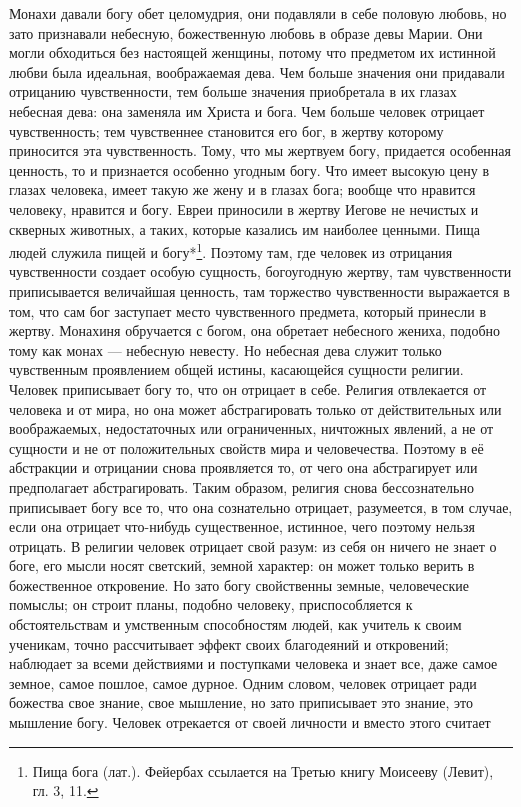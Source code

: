 \documentclass[12pt,oneside]{book}
\begin{document}
Монахи давали богу обет целомудрия, они подавляли в себе половую любовь, но зато признавали небесную, божественную любовь в образе девы Марии. Они могли обходиться без настоящей женщины, потому что предметом их истинной любви была идеальная, воображаемая дева. Чем больше значения они придавали отрицанию чувственности, тем больше значения приобретала в их глазах небесная дева: она заменяла им Христа и бога. Чем больше человек отрицает чувственность; тем чувственнее становится его бог, в жертву которому приносится эта чувственность. Тому, что мы жертвуем богу, придается особенная ценность, то и признается особенно угодным богу. Что имеет высокую цену в глазах человека, имеет такую же жену и в глазах бога; вообще что нравится человеку, нравится и богу. Евреи приносили в жертву Иегове не нечистых и скверных животных, а таких, которые казались им наиболее ценными. Пища людей служила пищей и богу*\let\svthefootnote\thefootnote\let\thefootnote\relax{}\let\thefootnote\svthefootnote\footnote{Пища бога (лат.). Фейербах ссылается на Третью книгу Моисееву (Левит), гл. 3, 11.}. Поэтому там, где человек из отрицания чувственности создает особую сущность, богоугодную жертву, там чувственности приписывается величайшая ценность, там торжество чувственности выражается в том, что сам бог заступает место чувственного предмета, который принесли в жертву. Монахиня обручается с богом, она обретает небесного жениха, подобно тому как монах --- небесную невесту. Но небесная дева служит только чувственным проявлением общей истины, касающейся сущности религии. Человек приписывает богу то, что он отрицает в себе\dag\let\svthefootnote\thefootnote\let\thefootnote\relax{}\let\thefootnote\svthefootnote. Религия отвлекается от человека и от мира, но она может абстрагировать только от действительных или воображаемых, недостаточных или ограниченных, ничтожных явлений, а не от сущности и не от положительных свойств мира и человечества. Поэтому в её абстракции и отрицании снова проявляется то, от чего она абстрагирует или предполагает абстрагировать. Таким образом, религия снова бессознательно приписывает богу все то, что она сознательно отрицает, разумеется, в том случае, если она отрицает что-нибудь существенное, истинное, чего поэтому нельзя отрицать. В религии человек отрицает свой разум: из себя он ничего не знает о боге, его мысли носят светский, земной характер: он может только верить в божественное откровение. Но зато богу свойственны земные, человеческие помыслы; он строит планы, подобно человеку, приспособляется к обстоятельствам и умственным способностям людей, как учитель к своим ученикам, точно рассчитывает эффект своих благодеяний и откровений; наблюдает за всеми действиями и поступками человека и знает все, даже самое земное, самое пошлое, самое дурное. Одним словом, человек отрицает ради божества свое знание, свое мышление, но зато приписывает это знание, это мышление богу. Человек отрекается от своей личности и вместо этого считает 
\end{document}
